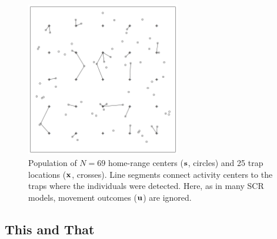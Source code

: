 \begin{figure}
\begin{center}
\includegraphics[width=0.6\textwidth]{Ch1b/figs/SCR0}
\end{center}
\caption{Population of $N=69$ home-range centers ($\bf s$,
  circles) and 25 trap locations ($\bf x$, crosses). Line segments connect
  activity centers to the traps where the individuals were
  detected. Here, as in many SCR models, movement outcomes ($\bf u$)
  are ignored.}
\label{modeling.fig.fig1}
\end{figure}

\subsection{This and That}

